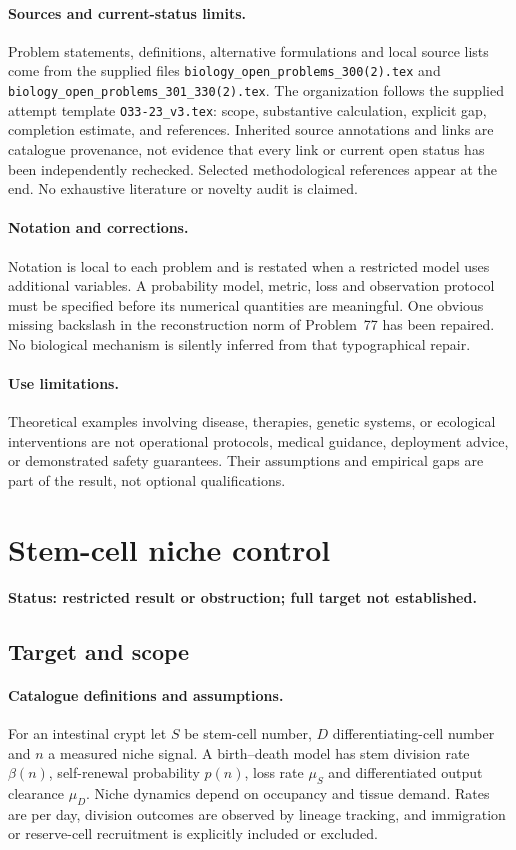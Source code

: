 \documentclass[11pt]{article}
\begin{document}
\paragraph{Sources and current-status limits.}
Problem statements, definitions, alternative formulations and local source lists
come from the supplied files
\texttt{biology\_open\_problems\_300(2).tex} and
\texttt{biology\_open\_problems\_301\_330(2).tex}.
The organization follows the supplied attempt template
\texttt{O33-23\_v3.tex}: scope, substantive calculation, explicit gap,
completion estimate, and references. Inherited source annotations and links are
catalogue provenance, not evidence that every link or current open status has
been independently rechecked. Selected methodological references appear at the
end. No exhaustive literature or novelty audit is claimed.

\paragraph{Notation and corrections.}
Notation is local to each problem and is restated when a restricted model uses
additional variables. A probability model, metric, loss and observation protocol
must be specified before its numerical quantities are meaningful. One obvious
missing backslash in the reconstruction norm of Problem~77 has been repaired.
No biological mechanism is silently inferred from that typographical repair.

\paragraph{Use limitations.}
Theoretical examples involving disease, therapies, genetic systems, or ecological
interventions are not operational protocols, medical guidance, deployment advice,
or demonstrated safety guarantees. Their assumptions and empirical gaps are part
of the result, not optional qualifications.


\section*{Stem-cell niche control}
\label{prob:137}
\noindent\textbf{Status: restricted result or obstruction; full target not established.}
\subsection{Target and scope}
\paragraph{Catalogue definitions and assumptions.}
For an intestinal crypt let $S$ be stem-cell number, $D$ differentiating-cell number and $n$ a measured niche signal. A birth--death model has stem division rate $\beta(n)$, self-renewal probability $p(n)$, loss rate $\mu_S$ and differentiated output clearance $\mu_D$. Niche dynamics depend on occupancy and tissue demand. Rates are per day, division outcomes are observed by lineage tracking, and immigration or reserve-cell recruitment is explicitly included or excluded.
\end{document}
